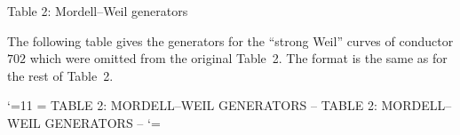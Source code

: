 %
%
\head  Table 2: Mordell--Weil generators \endhead
\nobreak

The following table gives the generators for the ``strong Weil'' curves of
conductor $702$ which were omitted from the original Table~2.  The
format is the same as for the rest of Table~2.

\bigskip

\catcode`\@=11
\def\rightheadline{\hfill TABLE 2: MORDELL--WEIL GENERATORS
\firstc--\lastc\hfill \llap{\folio}} 
\def\leftheadline{\llap{\folio} \hfill TABLE 2: MORDELL--WEIL GENERATORS \firstc--\lastc
\hfill}
\headline={\def\chapter#1{}%
  \def\\{\unskip\space\ignorespaces}\headlinefont@
  \ifodd\pageno \rightheadline \else \leftheadline\fi}
\catcode`\@=\active

%
%
\def\gap#1{\omit&height #1pt &&&&&&&&\cr}
\def\topline{\noalign{\hrule}\gap2}
\def\hline{\gap2\noalign{\hrule}\gap2}
\def\smallhline{\gap1\noalign{\hrule}\gap1}
\def\botline{\gap2\noalign{\hrule}}
%
\def\headings{&&\multispan3\hfil Curve\hfil&&x&&y&\cr}
%
\def\tabletitle(#1)#2-#3:{\leftline{\bf Table 2.#1: Generators #2--#3.}
                          \medskip}
%
\newbox\ltab
\newbox\mtab
\newbox\rtab
%
\def\settable#1{\offinterlineskip
\halign to 2.1 truein{\tabskip 0pt
##\strut&\vrule##\tabskip 5pt plus 1fil minus 4pt &%
\hfill##\tabskip1pt&%
\hfil##\hfil&%
\hfil##\hfil\tabskip 5pt plus 1fil minus 4pt&%
\vrule##&%
\hfill$##$\hfill&%
\vrule##&%
\hfill$##$\hfill&%
\vrule##\tabskip0pt\cr%
\topline                                                               %
\headings                                                              %
\smallhline                                                            %
#1                %
\botline
}                 %
}                 %
%
\def\setltab#1{\setbox\ltab\vtop{\settable{#1}}}
\def\setmtab#1{\setbox\mtab\vtop{\settable{#1}}}
\def\setrtab#1{\setbox\rtab\vtop{\settable{#1}}}
%
\def\tablepage#1,#2-#3.{
                        \line{\box\ltab\hfill\box\mtab\hfill\box\rtab}
                        \vfill
                        \def\firstc{#2}\def\lastc{#3}
                       }
\def\twogens(#1,#2),(#3,#4){\displaystyle\left\{{#1\atop#3}\right. &&%
                            \displaystyle\left. {#2\atop#4}\right\}
                           }

